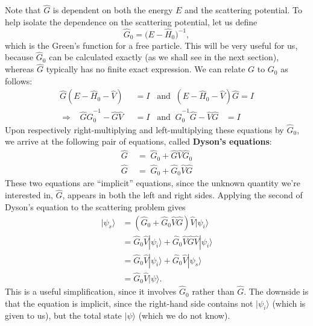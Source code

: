 \documentclass[pra,12pt]{revtex4}
\begin{document}
Note that $\hat{G}$ is dependent on both the energy $E$ and the
scattering potential.  To help isolate the dependence on the
scattering potential, let us define
$$\hat{G}_0=\big(E-\hat{H}_0\big)^{-1},$$
which is the Green's function for a free particle.  This will be very
useful for us, because $\hat{G}_0$ can be calculated exactly (as we
shall see in the next section), whereas $\hat{G}$ typically has no
finite exact expression.  We can relate $G$ to $G_0$ as follows:
$$\begin{aligned}\hat{G}(E-\hat{H}_0 - \hat{V})\;\; &= I \;\;\;\mathrm{and}\;\; (E-\hat{H}_0 - \hat{V})\hat{G} = I \\ \Rightarrow \;\;\; \hat{G} \hat{G}_0^{-1} - \hat{G}\hat{V} &= I \;\;\; \mathrm{and}\;\; \hat{G}_0^{-1} \hat{G} - \hat{V}\hat{G} \;\;\;= I\end{aligned}$$
Upon respectively right-multiplying and left-multiplying these equations
by $\hat{G}_0$, we arrive at the following pair of equations, called
\textbf{Dyson's equations}:
$$\boxed{\begin{aligned} \;\;\hat{G} \;&= \; \hat{G}_0 + \hat{G}\hat{V}\hat{G}_0\;\; \\ \;\;\hat{G} \;&=\; \hat{G}_0 + \hat{G}_0\hat{V}\hat{G} \;\;\end{aligned}}$$
These two equations are ``implicit'' equations, since the unknown
quantity we're interested in, $\hat{G}$, appears in both the left and
right sides.  Applying the second of Dyson's equation to the
scattering problem gives
$$\begin{aligned}|\psi_s\rangle &= \left(\hat{G}_0 + \hat{G}_0\hat{V}\hat{G}\right) \hat{V} |\psi_i\rangle \\ &= \hat{G}_0 \hat{V} |\psi_i\rangle + \hat{G}_0\hat{V}\hat{G} \hat{V} |\psi_i\rangle \\ &= \hat{G}_0 \hat{V} |\psi_i\rangle + \hat{G}_0\hat{V} |\psi_s\rangle \\ &= \hat{G}_0\hat{V} |\psi\rangle.\end{aligned}$$
This is a useful simplification, since it involves $\hat{G}_0$ rather
than $\hat{G}$.  The downside is that the equation is implicit, since
the right-hand side contains not $|\psi_i\rangle$ (which is given to
us), but the total state $|\psi\rangle$ (which we do not know).
\end{document}
